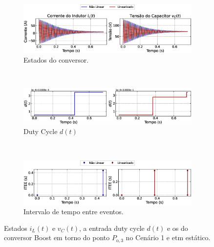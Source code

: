 \begin{figure}[H]
  \centering
  \captionsetup{justification=centering}
  \begin{subfigure}{1.\textwidth}
    \centering
    \includegraphics[width=1.\textwidth]{figuras/static-etm/boost/sim1/op1/result.eps}
    \caption{Estados do conversor.}
    \label{fig:boost_converter_constant_pcpl_static_etm_op1_duty_a}
  \end{subfigure}
  \\[6pt]
  \begin{subfigure}{1.\textwidth}
    \centering
    \includegraphics[width=1.\textwidth]{figuras/static-etm/boost/sim1/op1/duty-cycle.eps}
    \caption{Duty Cycle $d(t)$}
    \label{fig:boost_converter_constant_pcpl_static_etm_op1_duty_b}
  \end{subfigure}
  \\[6pt]
  \begin{subfigure}{1.\textwidth}
    \centering
    \includegraphics[width=1.\textwidth]{figuras/static-etm/boost/sim1/op1/inter-event-times.eps}
    \caption{Intervalo de tempo entre eventos.}
    \label{fig:boost_converter_constant_pcpl_static_etm_op1_duty_c}
  \end{subfigure}
  \caption{Estados $i_L(t)$ e $v_C(t)$, a entrada duty cycle $d(t)$ e os  do conversor Boost em torno do ponto $P_{\mathrm{o}, 3}$ no Cenário 1 e \acrshort{etm} estático.}
\end{figure}

